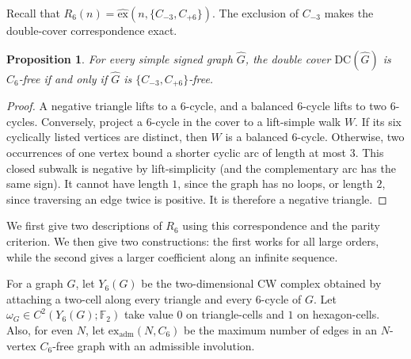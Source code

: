 \documentclass{article}
\newcommand{\DC}{\mathrm{DC}}
\newcommand{\ex}{\mathrm{ex}}
\newcommand{\hex}{\widehat{\ex}}
\newcommand{\exadm}{\ex_{\mathrm{adm}}}
\newcommand{\FF}{\mathbb{F}}
\newtheorem{proposition}[theorem]{Proposition}
\theoremstyle{definition}
\theoremstyle{remark}
\begin{document}
Recall that $R_6(n)=\hex(n,\{C_{-3},C_{+6}\})$.  The exclusion of
$C_{-3}$ makes the double-cover correspondence exact.

\begin{proposition}\label{cor:exact-C6}
For every simple signed graph $\widehat G$, the double cover
$\DC(\widehat G)$ is $C_6$-free if and only if $\widehat G$ is
$\{C_{-3},C_{+6}\}$-free.
\end{proposition}
\begin{proof}
A negative triangle lifts to a $6$-cycle, and a balanced $6$-cycle lifts
to two $6$-cycles.  Conversely, project a $6$-cycle in the cover to a
lift-simple walk $W$.  If its six cyclically listed vertices are distinct,
then $W$ is a balanced $6$-cycle.  Otherwise, two occurrences of one vertex
bound a shorter cyclic arc of length at most $3$.  This closed subwalk is
negative by lift-simplicity (and the complementary arc has the same sign).
It cannot have length $1$, since the graph has no loops, or length $2$,
since traversing an edge twice is positive.  It is therefore a negative
triangle.
\end{proof}

We first give two descriptions of $R_6$ using this correspondence and the
parity criterion.  We then give two constructions: the first works for all
large orders, while the second gives a larger coefficient along an infinite
sequence.

For a graph $G$, let $Y_6(G)$ be the two-dimensional CW complex obtained
by attaching a two-cell along every triangle and every $6$-cycle of $G$.  Let
$\omega_G\in C^2(Y_6(G);\FF_2)$ take value $0$ on triangle-cells and
$1$ on hexagon-cells.  Also, for even $N$, let $\exadm(N,C_6)$ be the
maximum number of edges in an $N$-vertex $C_6$-free graph with an admissible
involution.
\end{document}
